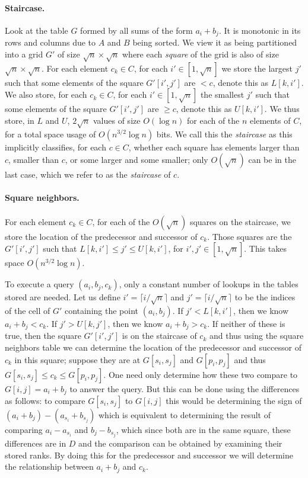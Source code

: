 \paragraph{Staircase.}
  Look at the table $G$ formed by all sums of the form $a_i+b_j$. It is
  monotonic in its rows and columns due to $A$ and $B$ being sorted. We view it
  as being partitioned into a grid $G'$ of size $\sqrt{n}\times \sqrt{n}$ where
  each \emph{square} of the grid is also of size $\sqrt{n}\times \sqrt{n}$.
  For each element $c_k \in C$, for each $i'\in[1,\sqrt{n}]$ we store the largest
  $j'$ such that some elements of the square $G'[i',j']$ are  $< c$, denote this as
  $L[k,i']$.
  We also store, for each $c_k \in C$, for each $i'\in[1,\sqrt{n}]$ the smallest
  $j'$ such that some elements of the square $G'[i',j']$ are  $\geq c$, denote this as
  $U[k,i']$.
  We thus store, in $L$ and $U$, $2 \sqrt{n}$ values of size $O(\log n)$ for each
  of the $n$ elements of $C$, for a total space usage of $O(n^{3/2}\log n)$ bits.
  We call this the \emph{staircase} as this implicitly classifies, for each $c
  \in C$, whether each square has elements larger than $c$, smaller than $c$, or
  some larger and some smaller; only $O(\sqrt{n})$ can be in the last case, which
  we refer to as the \emph{staircase} of $c$.

\paragraph{Square neighbors.}
  For each element $c_k \in C$, for each of the $O(\sqrt{n})$ squares on the
  staircase, we store the location of the predecessor and successor of $c_k$.
  Those squares are the \(G'[i',j']\) such that
  $L[k,i'] \le j' \le U[k,i']$, for $i',j' \in [1,\sqrt{n}]$.
  This takes space $O(n^{3/2}\log n)$.

To execute a query $(a_i,b_j,c_k)$, only a constant number of lookups in the
tables stored are needed.
Let us define \(i' = \lceil i / \sqrt{n} \rceil\)
and \(j' = \lceil i / \sqrt{n} \rceil\) to be the indices of the cell of
\(G'\) containing the point \((a_i, b_j)\).
If $j' < L[k,i']$, then we know $a_i + b_j < c_k$.
If $j' > U[k,j']$, then we know $a_i + b_j > c_k$.
If neither of these is true, then the square $G'[i',j']$ is on the staircase of
$c_k$ and thus using
the square neighbors table we can determine the location of the predecessor and
successor of $c_k$ in this square; suppose they are at $G[s_i,s_j]$ and
$G[p_i,p_j]$ and thus $G[s_i,s_j] \leq c_k \leq G[p_i,p_j]$. One need only
determine how these two compare to $G[i,j]=a_i+b_j$ to answer the query. But
this can be done using the differences as follows: to compare $G[s_i,s_j]$ to
$G[i,j]$ this would be determining the sign of $(a_i+b_j)-(a_{s_i}+b_{s_j})$
which is equivalent to determining the result of comparing $a_i-a_{s_i}$ and
$b_j-b_{s_j}$, which since both are in the same square, these differences are
in $D$ and the comparison can be obtained by examining their stored ranks. By
doing this for the predecessor and successor we will determine the relationship
between $a_i+b_j$ and $c_k$.

